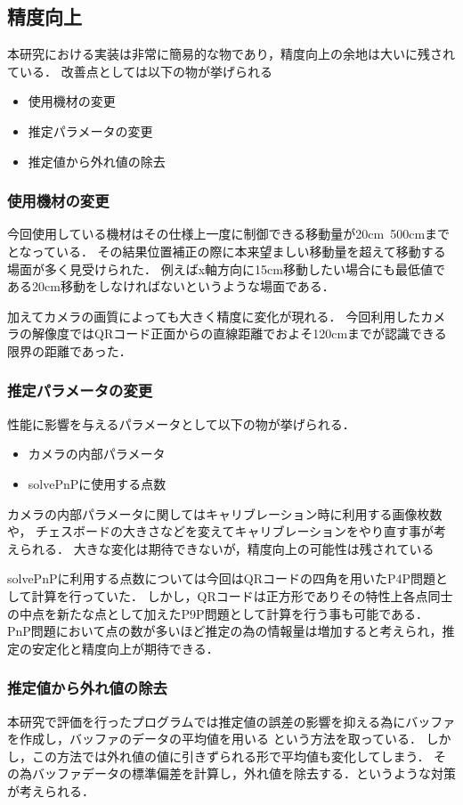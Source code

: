 \subsection{精度向上}
本研究における実装は非常に簡易的な物であり，精度向上の余地は大いに残されている．
改善点としては以下の物が挙げられる
\begin{itemize}
    \item 使用機材の変更
    \item 推定パラメータの変更
    \item 推定値から外れ値の除去
\end{itemize}

\subsubsection{使用機材の変更}
今回使用している機材はその仕様上一度に制御できる移動量が20cm~500cmまでとなっている．
その結果位置補正の際に本来望ましい移動量を超えて移動する場面が多く見受けられた．
例えばx軸方向に15cm移動したい場合にも最低値である20cm移動をしなければないというような場面である．

加えてカメラの画質によっても大きく精度に変化が現れる．
今回利用したカメラの解像度ではQRコード正面からの直線距離でおよそ120cmまでが認識できる限界の距離であった．

\subsubsection{推定パラメータの変更}
性能に影響を与えるパラメータとして以下の物が挙げられる．
\begin{itemize}
    \item カメラの内部パラメータ
    \item solvePnPに使用する点数
\end{itemize}
カメラの内部パラメータに関してはキャリブレーション時に利用する画像枚数や，
チェスボードの大きさなどを変えてキャリブレーションをやり直す事が考えられる．
大きな変化は期待できないが，精度向上の可能性は残されている

solvePnPに利用する点数については今回はQRコードの四角を用いたP4P問題として計算を行っていた．
しかし，QRコードは正方形でありその特性上各点同士の中点を新たな点として加えたP9P問題として計算を行う事も可能である．
PnP問題において点の数が多いほど推定の為の情報量は増加すると考えられ，推定の安定化と精度向上が期待できる．

\subsubsection{推定値から外れ値の除去}
本研究で評価を行ったプログラムでは推定値の誤差の影響を抑える為にバッファを作成し，バッファのデータの平均値を用いる
という方法を取っている．
しかし，この方法では外れ値の値に引きずられる形で平均値も変化してしまう．
その為バッファデータの標準偏差を計算し，外れ値を除去する．というような対策が考えられる．


